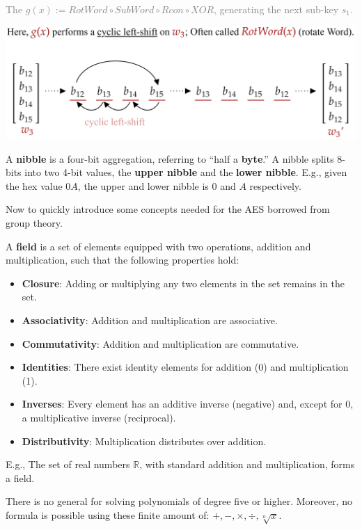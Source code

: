 \noindent
\textcolor{gray}{The $g(x):=RotWord \circ SubWord \circ Rcon \circ XOR$, generating the next sub-key $s_1$.}

\vspace{1em}
\hspace{-3em}
\includegraphics[width=1.1\textwidth]{Sections/sec/enc/aes/g_func.png}

\newpage
\noindent
\begin{Def}[Nibble]

    \label{theo:nibble}
    A \textbf{nibble} is a four-bit aggregation, referring to ``half a \textbf{byte}.'' A nibble splits 8-bits into two 4-bit values,
    the \textbf{upper nibble} and the \textbf{lower nibble}. E.g., given the hex value $0A$,
    the upper and lower nibble is $0$ and $A$ respectively.
\end{Def}
Now to quickly introduce some concepts needed for the AES borrowed from group theory.
\begin{Def}[Field]

    \label{def:field}
    A \textbf{field} is a set of elements equipped with two operations, addition and multiplication, such that the following properties hold:
    \begin{itemize}
        \item \textbf{Closure}: Adding or multiplying any two elements in the set remains in the set.
        \item \textbf{Associativity}: Addition and multiplication are associative.
        \item \textbf{Commutativity}: Addition and multiplication are commutative.
        \item \textbf{Identities}: There exist identity elements for addition (0) and multiplication (1).
        \item \textbf{Inverses}: Every element has an additive inverse (negative) and, except for 0, a multiplicative inverse (reciprocal).
        \item \textbf{Distributivity}: Multiplication distributes over addition.
    \end{itemize}

    \noindent
    E.g., The set of real numbers $\mathbb{R}$, with standard addition and multiplication, forms a field.
\end{Def}
\begin{theo}

    \label{theo:abel_ruffini}
    There is no general for solving polynomials of degree five or higher. Moreover,
    no formula is possible using these finite amount of: $+,-,\times,\div,\sqrt[n]{x}$.
\end{theo}

